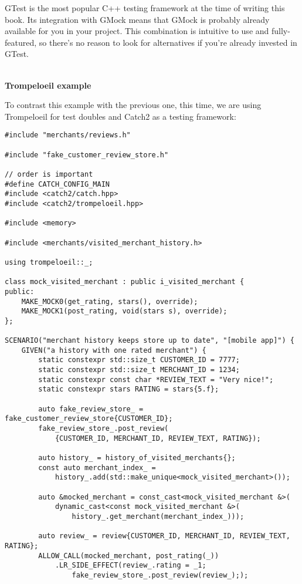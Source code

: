 GTest is the most popular C++ testing framework at the time of writing this book. Its integration with GMock means that GMock is probably already available for you in your project. This combination is intuitive to use and fully-featured, so there's no reason to look for alternatives if you're already invested in GTest.

\hspace*{\fill} \\ %
\noindent
\textbf{Trompeloeil example}

To contrast this example with the previous one, this time, we are using Trompeloeil for test doubles and Catch2 as a testing framework:

\begin{lstlisting}[style=styleCXX]
#include "merchants/reviews.h"

#include "fake_customer_review_store.h"

// order is important
#define CATCH_CONFIG_MAIN
#include <catch2/catch.hpp>
#include <catch2/trompeloeil.hpp>

#include <memory>

#include <merchants/visited_merchant_history.h>

using trompeloeil::_;

class mock_visited_merchant : public i_visited_merchant {
public:
	MAKE_MOCK0(get_rating, stars(), override);
	MAKE_MOCK1(post_rating, void(stars s), override);
};

SCENARIO("merchant history keeps store up to date", "[mobile app]") {
	GIVEN("a history with one rated merchant") {
		static constexpr std::size_t CUSTOMER_ID = 7777;
		static constexpr std::size_t MERCHANT_ID = 1234;
		static constexpr const char *REVIEW_TEXT = "Very nice!";
		static constexpr stars RATING = stars{5.f};
		
		auto fake_review_store_ = fake_customer_review_store{CUSTOMER_ID};
		fake_review_store_.post_review(
			{CUSTOMER_ID, MERCHANT_ID, REVIEW_TEXT, RATING});
		
		auto history_ = history_of_visited_merchants{};
		const auto merchant_index_ =
			history_.add(std::make_unique<mock_visited_merchant>());
			
		auto &mocked_merchant = const_cast<mock_visited_merchant &>(
			dynamic_cast<const mock_visited_merchant &>(
				history_.get_merchant(merchant_index_)));
				
		auto review_ = review{CUSTOMER_ID, MERCHANT_ID, REVIEW_TEXT, RATING};
		ALLOW_CALL(mocked_merchant, post_rating(_))
			.LR_SIDE_EFFECT(review_.rating = _1;
				fake_review_store_.post_review(review_););
	

\end{lstlisting}
